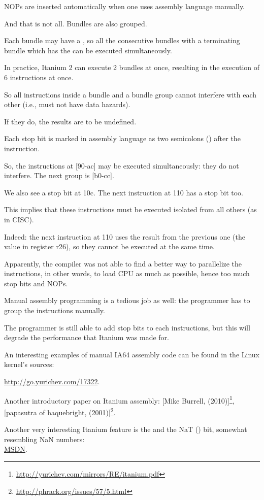 \ac{NOP}s are inserted automatically when one uses assembly language manually.

And that is not all. Bundles are also grouped.

Each bundle may have a ,
so all the consecutive bundles with a terminating bundle which has the  
can be executed simultaneously.

In practice, Itanium 2 can execute 2 bundles at once, resulting in the execution of 6 instructions at once.

So all instructions inside a bundle and a bundle group cannot interfere with each other 
(i.e., must not have data hazards).

If they do, the results are to be undefined.

Each stop bit is marked in assembly language as two semicolons (\TT{;;}) after the instruction.

So, the instructions at [90-ac] may be executed simultaneously:
they do not interfere. The next group is [b0-cc].

We also see a stop bit at 10c.
The next instruction at 110 has a stop bit too.

This implies that these instructions must be executed isolated from all others (as in \ac{CISC}).

Indeed: the next instruction at 110 uses the result from the previous one (the value in register r26),
so they cannot be executed at the same time.

Apparently, the compiler was not able to find a better way to parallelize the instructions,
in other words, to load \ac{CPU} as much as possible, hence too much stop bits and \ac{NOP}s.

Manual assembly programming is a tedious job as well: the programmer has to group the instructions manually.

The programmer is still able to add stop bits to each instructions, but this will degrade
the performance that Itanium was made for.

An interesting examples of manual \ac{IA64} assembly code can be found in the Linux kernel's sources:

\url{http://go.yurichev.com/17322}.

Another introductory paper on Itanium assembly:
[Mike Burrell,  (2010)]\footnote{\AlsoAvailableAs \url{http://yurichev.com/mirrors/RE/itanium.pdf}},
[papasutra of haquebright,  (2001)]\footnote{\AlsoAvailableAs \url{http://phrack.org/issues/57/5.html}}.

Another very interesting Itanium feature is the  and the NaT () bit,
somewhat resembling \gls{NaN} numbers: \\
\href{http://go.yurichev.com/17323}{MSDN}.

